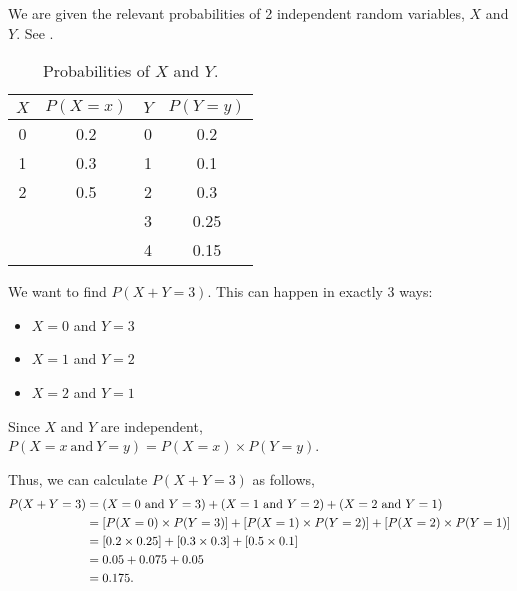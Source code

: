 \begin{subquestions}
\subquestion

We are given the relevant probabilities of 2 independent random variables, $X$ and $Y$. See .
\begin{table}[ht]
	\centering
	\begin{tabular}{|c|c|c|c|}
		\hline
		$X$ & $P(X=x)$ & $Y$ & $P(Y=y)$ \\
		\hline
		0 & 0.2 & 0 & 0.2 \\
		1 & 0.3 & 1 & 0.1 \\
		2 & 0.5 & 2 & 0.3 \\
		  &     & 3 & 0.25 \\
		  &     & 4 & 0.15 \\
		  \hline
	\end{tabular}
	\caption{\label{2014:q4:Tab1} Probabilities of $X$ and $Y$.}
\end{table}

\begin{subsubquestions} 

\subsubquestion

We want to find $P(X+Y=3)$. This can happen in exactly 3 ways:
\begin{itemize}
	\item $X = 0$ and $Y = 3$
	\item $X = 1$ and $Y = 2$
	\item $X = 2$ and $Y = 1$
\end{itemize}

Since $X$ and $Y$ are independent, $P(X=x ~\text{and}~ Y=y) = P(X=x) \times P(Y=y)$.

Thus, we can calculate $P(X+Y=3)$ as follows,
\begin{align}
	P(X+Y=3) & = (X=0 ~\text{and}~ Y=3) + (X=1 ~\text{and}~ Y=2) + (X=2 ~\text{and}~ Y=1) \nonumber \\
	         & = [P(X=0) \times P(Y=3)] + [P(X=1) \times P(Y=2)] + [P(X=2) \times P(Y=1)] \nonumber \\
	         & = [0.2 \times 0.25] + [0.3 \times 0.3] + [0.5 \times 0.1] \nonumber \\ 
	         & = 0.05 + 0.075+0.05 \nonumber \\
	         & = 0.175.
\end{align}


\subsubquestion

\begin{subsubsubquestions}
	

\end{subsubsubquestions}
\end{subsubquestions}
\end{subquestions}
